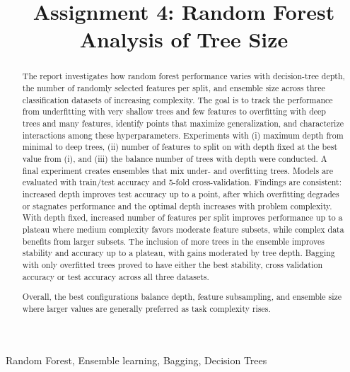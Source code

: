 \documentclass[conference]{IEEEtran}
\begin{document}
\title{Assignment 4: Random Forest Analysis of Tree Size}

\author{
}

\maketitle


\begin{abstract}
The report investigates how random forest performance varies with decision-tree depth, the number of randomly selected features per 
split, and ensemble size across three classification datasets of increasing complexity. The goal is to track the performance from 
underfitting with very shallow trees and few features to overfitting with deep trees and many features, identify points 
that maximize generalization, and characterize interactions among these hyperparameters. Experiments with (i) maximum depth from minimal to deep trees, (ii) number of features to 
split on with depth fixed at the best value from (i), and (iii) the balance number of trees with depth were conducted. A final experiment 
creates ensembles that mix under- and overfitting trees. Models are evaluated with train/test accuracy and 5-fold cross-validation. Findings 
are consistent: increased depth improves test accuracy up to a point, after which overfitting degrades or stagnates 
performance and the optimal depth increases with problem complexity. With depth fixed, increased number of features per split
 improves performance up to a plateau where medium complexity favors moderate feature subsets, while complex data benefits from larger subsets. 
 The inclusion of more trees in the ensemble improves stability and accuracy up to a plateau, with gains moderated by tree depth. 
 Bagging with only overfitted trees proved to have either the best stability, cross validation accuracy or test accuracy across all three datasets. 

  Overall, the best configurations balance depth, feature subsampling, and ensemble size where larger values are generally preferred as 
  task complexity rises. 
\end{abstract}


\begin{IEEEkeywords}
Random Forest, Ensemble learning, Bagging, Decision Trees
\end{IEEEkeywords}
\end{document}
